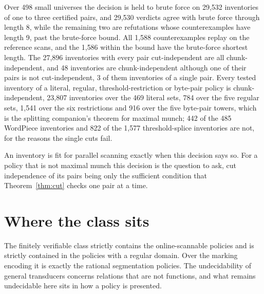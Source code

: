\documentclass[11pt,a4paper]{article}
\theoremstyle{definition}
\theoremstyle{plain}
\begin{document}
Over 498 small universes the decision is held to brute force on 29{,}532 inventories of one to three certified pairs,
and 29{,}530 verdicts agree with brute force through length 8, while the remaining two are refutations whose
counterexamples have length 9, past the brute-force bound. All 1{,}588 counterexamples replay on the reference scans,
and the 1{,}586 within the bound have the brute-force shortest length. The 27{,}896 inventories with every pair
cut-independent are all chunk-independent, and 48 inventories are chunk-independent although one of their pairs is not
cut-independent, 3 of them inventories of a single pair. Every tested inventory of a literal, regular,
threshold-restriction or byte-pair policy is chunk-independent, 23{,}807 inventories over the 469 literal sets, 784 over
the five regular sets, 1{,}541 over the six restrictions and 916 over the five byte-pair towers, which is the splitting
companion's theorem for maximal munch; 442 of the 485 WordPiece inventories and 822 of the 1{,}577 threshold-splice
inventories are not, for the reasons the single cuts fail.

An inventory is fit for parallel scanning exactly when this decision says so. For a policy that is not maximal munch
this decision is the question to ask, cut independence of its pairs being only the sufficient condition that
Theorem~\ref{thm:cut} checks one pair at a time.

\section{Where the class sits}\label{sec:real}


The finitely verifiable class strictly contains the online-scannable policies and is strictly contained in the policies
with a regular domain. Over the marking encoding it is exactly the rational segmentation policies. The undecidability of
general transducers concerns relations that are not functions, and what remains undecidable here sits in how a policy is
presented.
\end{document}
